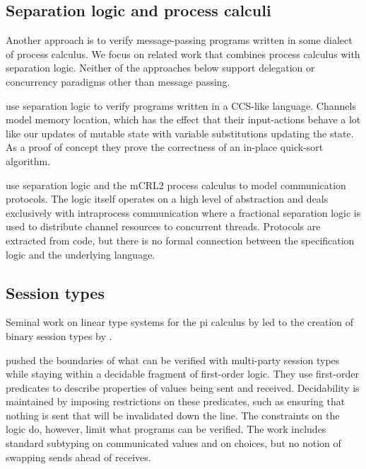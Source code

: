 \subsection{Separation logic and process calculi}
\label{sec:related_process}

Another approach is to verify message-passing programs written in some dialect
of process calculus.
We focus on related work that combines process calculus with separation logic.
Neither of the approaches below support delegation or concurrency paradigms
other than message passing.

\citet{francalanza-LMCS2011} use separation logic to verify
programs written in a CCS-like language.
Channels model memory location, which has the effect that their input-actions
behave a lot like our updates of mutable state with variable
substitutions updating the state. As a proof of concept they prove the
correctness of an in-place quick-sort algorithm.

\citet{oortwijn-PLACES2016} use separation logic and the mCRL2 process
calculus to model communication protocols.
The logic itself operates on a high level of abstraction and deals exclusively
with intraprocess communication where a fractional separation logic is
used to distribute channel resources to concurrent threads.
Protocols are extracted from code, but there is no formal connection
between the specification logic and the underlying language.

\subsection{Session types}
\label{sec:related_session}

Seminal work on linear type systems for the pi calculus by
\citet{kobayashi-POPL1996} led to the creation of binary session types
by \citet{honda-ESOP1998}.

\citet{bocchi-CONCUR2010} pushed the boundaries of
what can be verified with multi-party session types while staying within a
decidable fragment of first-order logic.
They use first-order predicates to describe
properties of values being sent and received.
Decidability is maintained by imposing restrictions on these predicates, such
as ensuring that nothing is sent that will be invalidated down the line.
The constraints on the logic do, however, limit what programs can be
verified.
The work includes standard subtyping on communicated values and on choices,
but no notion of swapping sends ahead of receives.

